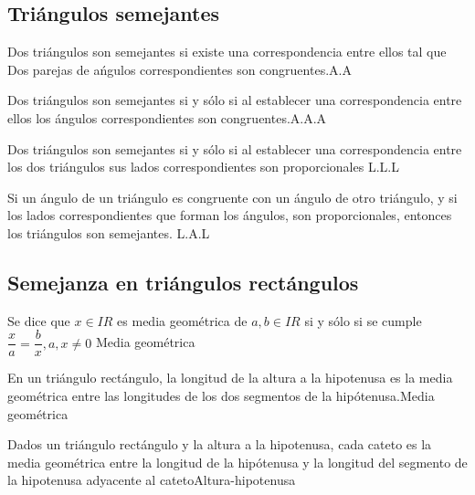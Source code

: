 \subsection{Tri\'angulos semejantes}
\begin{postulado}{
Dos tri\'angulos son semejantes si existe una correspondencia entre ellos
tal que Dos parejas de a\'ngulos correspondientes son congruentes.}{A.A}
\end{postulado}
\begin{teorema}{Dos tri\'angulos son semejantes si y s\'olo si al establecer
una correspondencia entre ellos los \'angulos correspondientes son
congruentes.}{A.A.A}
 \end{teorema}
\begin{teorema}{Dos tri\'angulos son semejantes si y s\'olo si al establecer
una correspondencia entre los dos tri\'angulos sus lados correspondientes son
proporcionales }{L.L.L}
\end{teorema}
\begin{teorema}{Si un \'angulo de un tri\'angulo es congruente con un \'angulo
de otro tri\'angulo, y si los lados correspondientes que forman los \'angulos,
son proporcionales, entonces los tri\'angulos son semejantes.
}{L.A.L}
\end{teorema}
\subsection{Semejanza en tri\'angulos rect\'angulos}
\begin{definicion}{
Se dice que $x \in I\! \! R $ es media geom\'etrica de $a,b \in I\! \! R$ si y
s\'olo si se cumple $\dfrac{x}{a}=\dfrac{b}{x}, a,x \neq 0$
}{Media geom\'etrica}
\end{definicion}

\begin{teorema}{En un tri\'angulo rect\'angulo, la longitud de la altura a la
hipotenusa es la media geom\'etrica entre las longitudes de los dos segmentos
de la hip\'otenusa.}{Media geom\'etrica}
\end{teorema}
\begin{teorema}{Dados un tri\'angulo rect\'angulo y la altura a la
hipotenusa, cada cateto es la media geom\'etrica entre la longitud de la
hip\'otenusa y la longitud del segmento de la hipotenusa adyacente al
cateto}{Altura-hipotenusa}
\end{teorema}



